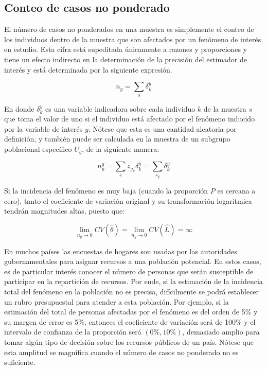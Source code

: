 \documentclass[
  12pt,
  spanish,
]{book}
\begin{document}
\hypertarget{conteo-de-casos-no-ponderado}{%
\subsection{Conteo de casos no ponderado}\label{conteo-de-casos-no-ponderado}}

El número de casos no ponderados en una muestra es simplemente el conteo de los individuos dentro de la muestra que son afectados por un fenómeno de interés en estudio. Esta cifra está supeditada únicamente a razones y proporciones y tiene un efecto indirecto en la determinación de la precisión del estimador de interés y está determinada por la siguiente expresión.

\[
n_y = \sum_{s}\delta_{k}^y
\]

En donde \(\delta_{k}^y\) es una variable indicadora sobre cada individuo \(k\) de la muestra \(s\) que toma el valor de uno si el individuo está afectado por el fenómeno inducido por la variable de interés \(y\). Nótese que esta es una cantidad aleatoria por definición, y también puede ser calculada en la muestra de un subgrupo poblacional específico \(U_g\), de la siguiente manera:

\[
n_y^g = \sum_{s}z_{g_k}\delta_{k}^y = \sum_{s_g}\delta_{k}^y
\]

Si la incidencia del fenómeno es muy baja (cuando la proporción \(P\) es cercana a cero), tanto el coeficiente de variación original y su transformación logarítmica tendrán magnitudes altas, puesto que:

\[
\lim_{n_y \rightarrow 0} CV(\hat \theta) = 
\lim_{n_y \rightarrow 0} CV(\hat L) = \infty
\]

En muchos países las encuestas de hogares son usadas por las autoridades gubernamentales para asignar recursos a una población potencial. En estos casos, es de particular interés conocer el número de personas que serán susceptible de participar en la repartición de recursos. Por ende, si la estimación de la incidencia total del fenómeno en la población no es precisa, difícilmente se podrá establecer un rubro presupuestal para atender a esta población. Por ejemplo, si la estimación del total de personas afectadas por el fenómeno es del orden de 5\% y su margen de error es 5\%, entonces el coeficiente de variación será de 100\% y el intervalo de confianza de la proporción será \((0 \%, 10 \%)\), demasiado amplio para tomar algún tipo de decisión sobre los recursos públicos de un país. Nótese que esta amplitud se magnifica cuando el número de casos no ponderado no es suficiente.
\end{document}
